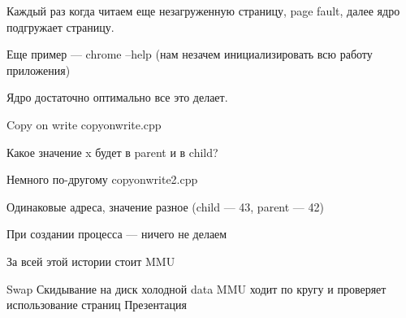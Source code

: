     Каждый раз когда читаем еще незагруженную страницу, page fault,
    далее ядро подгружает страницу.

    Еще пример --- chrome --help (нам незачем инициализировать всю работу приложения)

    Ядро достаточно оптимально все это делает.

Copy on write
    copyonwrite.cpp

    Какое значение x будет в parent и в child?

    Немного по-другому
    copyonwrite2.cpp

    Одинаковые адреса, значение разное (child --- 43, parent --- 42)

    При создании процесса --- ничего не делаем

    За всей этой истории стоит MMU

Swap
    Скидывание на диск холодной data
    MMU ходит по кругу и проверяет использование страниц
Презентация
